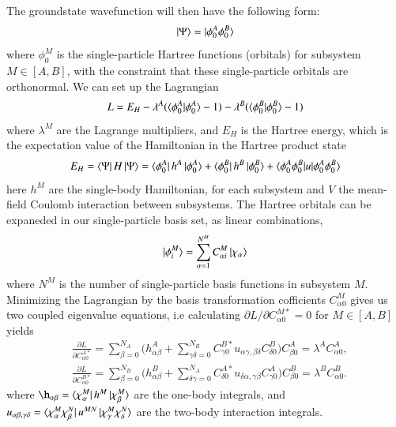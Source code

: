 \documentclass{subfiles}
\begin{document}
The groundstate wavefunction will then have the following form:
\begin{align*}
    \ket{\Psi} = \ket{\phi^A_0\phi^B_0}
\end{align*}
where $\phi_0^M$ is the single-particle Hartree functions (orbitals) for subsystem $M\in[A,B]$, with the constraint that these single-particle orbitals are orthonormal. We can set up the Lagrangian
\begin{align*}
    L = E_H - \lambda^A(\braket{\phi^A_0|\phi^A_0} - 1) - \lambda^B(\braket{\phi^B_0|\phi^B_0} - 1)
\end{align*}
where $\lambda^M$ are the Lagrange multipliers, and $E_H$ is the Hartree energy, which is the expectation value of the Hamiltonian in the Hartree product state
\begin{align*}
    E_H = \bra{\Psi}H\ket{\Psi} = \bra{\phi^A_0}h^A\ket{\phi^A_0} + \bra{\phi^B_0}h^B\ket{\phi^B_0} + \braket{\phi^A_0\phi^B_0|u|\phi^A_0\phi^B_0}
\end{align*}
here $h^M$ are the single-body Hamiltonian, for each subsystem and $V$ the mean-field Coulomb interaction between subsystems. The Hartree orbitals can be expaneded in our single-particle basis set, as linear combinations, 
\begin{align*}
    \ket{\phi^M_i} = \sum_{\alpha=1}^{N^M} C^M_{\alpha i}\ket{\chi_\alpha}
\end{align*}
where $N^M$ is the number of single-particle basis functions in subsystem $M$. Minimizing the Lagrangian by the basis transformation cofficients $C_{\alpha 0}^M$ gives us two coupled eigenvalue equations, i.e calculating $\partial L/\partial C_{\alpha 0}^{M*} = 0$ for $M\in[A,B]$ yields
\begin{align}
    &\frac{\partial L}{\partial C_{\alpha 0}^{A*}}  = \sum_{\beta=0}^{N_A}\big(h_{\alpha\beta}^A + \sum^{N_B}_{\gamma\delta=0}C^{B*}_{\gamma0} u_{\alpha\gamma,\beta\delta}C^B_{\delta0} \big)C^A_{\beta 0}  = \lambda^AC^A_{\alpha 0},\nonumber \\
    &\frac{\partial L}{\partial C_{\alpha 0}^{B*}}  = \sum_{\beta=0}^{N_B}\big(h_{\alpha\beta}^B + \sum^{N_A}_{\delta\gamma=0}C^{A*}_{\delta0} u_{\delta\alpha,\gamma\beta}C^A_{\gamma0} \big)C^B_{\beta 0}  = \lambda^BC^B_{\alpha 0}.\label{eq:bipartite_hartree}
\end{align}
where $\h_{\alpha\beta} = \bra{\chi_\alpha^M}h^M\ket{\chi_\beta^M}$ are the one-body integrals, and $u_{\alpha\beta,\gamma\delta} = \bra{\chi_\alpha^M\chi_\beta^N}u^{MN}\ket{\chi_\gamma^M\chi_\delta^N}$ are the two-body interaction integrals.  \\\\
\end{document}
